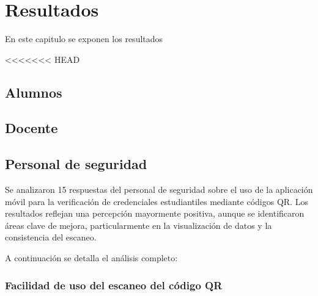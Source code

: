 \chapter{Resultados}

En este capitulo se exponen los resultados

<<<<<<< HEAD
\section{Alumnos}
\section{Docente}
\section{Personal de seguridad}

Se analizaron 15 respuestas del personal de seguridad sobre el uso de la aplicación móvil para la verificación de credenciales estudiantiles mediante códigos QR. Los resultados reflejan una percepción mayormente positiva, aunque se identificaron áreas clave de mejora, particularmente en la visualización de datos y la consistencia del escaneo.

A continuación se detalla el análisis completo:

\subsection{Facilidad de uso del escaneo del código QR}

